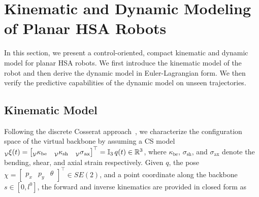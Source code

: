 \section{Kinematic and Dynamic Modeling of Planar HSA Robots}\label{sec:hsamodel:planar_hsa_robot_model}
In this section, we present a control-oriented, compact kinematic and dynamic model for planar \gls{HSA} robots. We first introduce the kinematic model of the robot and then derive the dynamic model in Euler-Lagrangian form. We then verify the predictive capabilities of the dynamic model on unseen trajectories.

\subsection{Kinematic Model}\label{sub:hsamodel:planar_hsa_robot_model:kinematics}
Following the discrete Cosserat approach~\citep{renda2018discrete}, we characterize the configuration space of the virtual backbone by assuming a \gls{CS} model
$\prescript{}{\mathcal{V}}{\xi}(t) = \begin{bmatrix}\prescript{}{{\mathcal{V}}}{\kappa}_\mathrm{be} & \prescript{}{{\mathcal{V}}}{\kappa}_\mathrm{sh} & \prescript{}{{\mathcal{V}}}{\sigma}_\mathrm{ax}\end{bmatrix}^\top = \mathbb{I}_3 \, q(t) \in \mathbb{R}^3$, where $\kappa_\mathrm{be}$, $\sigma_\mathrm{sh}$, and $\sigma_\mathrm{ax}$ denote the bending, shear, and axial strain respectively.
Given $q$, the pose $\chi = \begin{bmatrix}
    p_x & p_y & \theta
\end{bmatrix}^\top \in SE(2)$, and a point coordinate along the backbone $s \in [0, l^0]$, the forward and inverse kinematics are provided in closed form as

